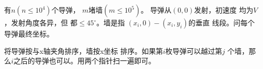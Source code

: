 \begin{prob}
	有$n(n \le 10^4)$个导弹，
	$m$堵墙$(m \le 10^5)$。
	导弹从$(0,0)$发射，初速度
	均为$V$，发射角度各异，但
	都$\le 45^{\circ}$。墙是指
	$(x_i,0)-(x_i,y_i)$的垂直
	线段。问每个导弹最终坐标。
\end{prob}

\begin{sol}
	将导弹按与x轴夹角排序，墙按x坐标
	排序。如果第$i$枚导弹可以越过第$j$
	个墙，那么$i$之后的导弹也可以。用两个指针扫一遍即可。
\end{sol}
